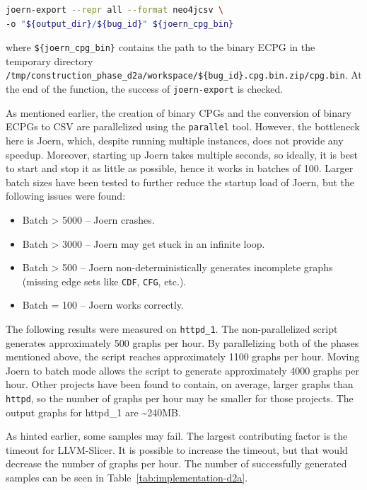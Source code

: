 \begin{lstlisting}[language=bash, xleftmargin=2em]
joern-export --repr all --format neo4jcsv \
-o "${output_dir}/${bug_id}" ${joern_cpg_bin}
\end{lstlisting}

where \texttt{\$\{joern\_cpg\_bin\}} contains the path to the binary ECPG in the temporary directory \texttt{/tmp/construction\_phase\_d2a/workspace/\$\{bug\_id\}.cpg.bin.zip/cpg.bin}. At the end of the function, the success of \texttt{joern-export} is checked.

As mentioned earlier, the creation of binary CPGs and the conversion of binary ECPGs to CSV are parallelized using the \texttt{parallel} tool. However, the bottleneck here is Joern, which, despite running multiple instances, does not provide any speedup. Moreover, starting up Joern takes multiple seconds, so ideally, it is best to start and stop it as little as possible, hence it works in batches of 100. Larger batch sizes have been tested to further reduce the startup load of Joern, but the following issues were found:
\begin{itemize}
\item Batch > 5000 -- Joern crashes.
\item Batch > 3000 -- Joern may get stuck in an infinite loop.
\item Batch > 500 -- Joern non-deterministically generates incomplete graphs (missing edge sets like \texttt{CDF}, \texttt{CFG}, etc.).
\item Batch = 100 -- Joern works correctly.
\end{itemize}

The following results were measured on \texttt{httpd\_1}. The non-parallelized script generates approximately 500 graphs per hour. By parallelizing both of the phases mentioned above, the script reaches approximately 1100 graphs per hour. Moving Joern to batch mode allows the script to generate approximately 4000 graphs per hour. Other projects have been found to contain, on average, larger graphs than \texttt{httpd}, so the number of graphs per hour may be smaller for those projects. The output graphs for httpd\_1 are \textasciitilde240MB.

As hinted earlier, some samples may fail. The largest contributing factor is the timeout for LLVM-Slicer. It is possible to increase the timeout, but that would decrease the number of graphs per hour. The number of successfully generated samples can be seen in Table~\ref{tab:implementation-d2a}.


